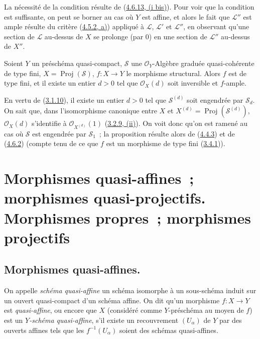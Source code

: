 
La nécessité de la condition résulte de
(\hyperref[II.4.6.13-fr]{4.6.13, (i bis)}). Pour voir que la condition est
suffisante, on peut se borner au cas où $Y$ est affine, et alors le fait
que $\mathcal{L}''$ est ample résulte du critère
(\hyperref[II.4.5.2-fr]{4.5.2, a)}) appliqué à $\mathcal{L}$,
$\mathcal{L}'$ et $\mathcal{L}''$, en observant qu'une section de
$\mathcal{L}$ au-dessus de $X$ se prolonge (par $0$) en une section de
$\mathcal{L}''$ au-dessus de $X''$.

\begin{proposition}[4.6.18]
\label{II.4.6.18-fr}
Soient $Y$ un préschéma quasi-compact, $\mathcal{S}$ une
$\mathcal{O}_Y$-Algèbre graduée quasi-cohérente de type fini,
$X=\operatorname{Proj}(\mathcal{S})$, $f:X\to Y$ le morphisme structural.
Alors $f$ est de type fini, et il existe un entier $d>0$ tel que
$\mathcal{O}_X(d)$ soit inversible et $f$-ample.
\end{proposition}

En vertu de (\hyperref[II.3.1.10-fr]{3.1.10}), il existe un entier $d>0$
tel que $\mathcal{S}^{(d)}$ soit engendrée par $\mathcal{S}_d$. On sait que,
dans l'isomorphisme canonique entre $X$ et
$X^{(d)}=\operatorname{Proj}(\mathcal{S}^{(d)})$, $\mathcal{O}_X(d)$
s'identifie à $\mathcal{O}_{X^{(d)}}(1)$
(\hyperref[II.3.2.9-fr]{3.2.9, (ii)}). On voit donc qu'on est ramené au cas
où $\mathcal{S}$ est engendrée par $\mathcal{S}_1$~; la proposition résulte
alors de (\hyperref[II.4.4.3-fr]{4.4.3}) et de
(\hyperref[II.4.6.2-fr]{4.6.2}) (compte tenu de ce que $f$ est un morphisme
de type fini (\hyperref[II.3.4.1-fr]{3.4.1})).

\section{Morphismes quasi-affines~; morphismes quasi-projectifs. Morphismes
propres~; morphismes projectifs}
\label{section:II.5-fr}

\subsection{Morphismes quasi-affines.}
\label{subsection:II.5.1-fr}

\begin{definition}[5.1.1]
\label{II.5.1.1-fr}
On appelle \emph{schéma quasi-affine} un schéma isomorphe à un sous-schéma
induit sur un ouvert quasi-compact d'un schéma affine. On dit qu'un morphisme
$f:X\to Y$ est \emph{quasi-affine}, ou encore que $X$ (considéré comme
$Y$-préschéma au moyen de $f$) est un \emph{$Y$-schéma quasi-affine}, s'il
existe un recouvrement $(U_\alpha)$ de $Y$ par des ouverts affines tels que
les $f^{-1}(U_\alpha)$ soient des schémas quasi-affines.
\end{definition}

